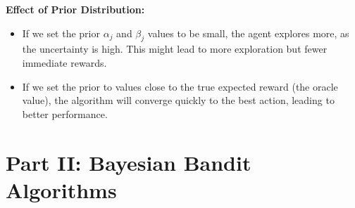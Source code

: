 \documentclass[11pt]{article}
\begin{document}
\begin{enumerate}[1.]
  \textbf{Effect of Prior Distribution:}
    \begin{itemize}
        \item If we set the prior \(\alpha_j\) and \(\beta_j\) values to be small, the agent explores more, as the uncertainty is high. This might lead to more exploration but fewer immediate rewards.
        \item If we set the prior to values close to the true expected reward (the oracle value), the algorithm will converge quickly to the best action, leading to better performance.
    \end{itemize}

\end{enumerate}

\newpage
\section{Part II: Bayesian Bandit Algorithms}



\appendix
\end{document}
